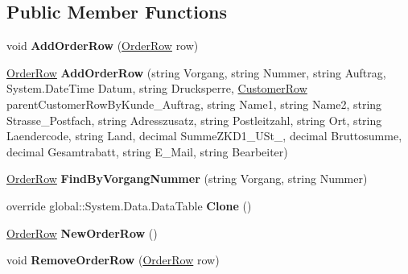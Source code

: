 \subsection*{Public Member Functions}
\begin{DoxyCompactItemize}
\item 
void {\bfseries Add\+Order\+Row} (\hyperlink{class_products_1_1_data_1_1ds_sage_1_1_order_row}{Order\+Row} row)\hypertarget{class_products_1_1_data_1_1ds_sage_1_1_order_data_table_a19b4b11e7de67d0c742c3235fbce2203}{}\label{class_products_1_1_data_1_1ds_sage_1_1_order_data_table_a19b4b11e7de67d0c742c3235fbce2203}

\item 
\hyperlink{class_products_1_1_data_1_1ds_sage_1_1_order_row}{Order\+Row} {\bfseries Add\+Order\+Row} (string Vorgang, string Nummer, string Auftrag, System.\+Date\+Time Datum, string Drucksperre, \hyperlink{class_products_1_1_data_1_1ds_sage_1_1_customer_row}{Customer\+Row} parent\+Customer\+Row\+By\+Kunde\+\_\+\+Auftrag, string Name1, string Name2, string Strasse\+\_\+\+Postfach, string Adresszusatz, string Postleitzahl, string Ort, string Laendercode, string Land, decimal Summe\+Z\+K\+D1\+\_\+\+U\+St\+\_, decimal Bruttosumme, decimal Gesamtrabatt, string E\+\_\+\+Mail, string Bearbeiter)\hypertarget{class_products_1_1_data_1_1ds_sage_1_1_order_data_table_a241a88a35aadd4bc88089666dfefdd51}{}\label{class_products_1_1_data_1_1ds_sage_1_1_order_data_table_a241a88a35aadd4bc88089666dfefdd51}

\item 
\hyperlink{class_products_1_1_data_1_1ds_sage_1_1_order_row}{Order\+Row} {\bfseries Find\+By\+Vorgang\+Nummer} (string Vorgang, string Nummer)\hypertarget{class_products_1_1_data_1_1ds_sage_1_1_order_data_table_a4be0bb55f6bb02e198df69dd40a54854}{}\label{class_products_1_1_data_1_1ds_sage_1_1_order_data_table_a4be0bb55f6bb02e198df69dd40a54854}

\item 
override global\+::\+System.\+Data.\+Data\+Table {\bfseries Clone} ()\hypertarget{class_products_1_1_data_1_1ds_sage_1_1_order_data_table_ada001c451ddc8700ef763bb0bf394cf2}{}\label{class_products_1_1_data_1_1ds_sage_1_1_order_data_table_ada001c451ddc8700ef763bb0bf394cf2}

\item 
\hyperlink{class_products_1_1_data_1_1ds_sage_1_1_order_row}{Order\+Row} {\bfseries New\+Order\+Row} ()\hypertarget{class_products_1_1_data_1_1ds_sage_1_1_order_data_table_ad6aab4e770b39c5fbe7d06e10c748cba}{}\label{class_products_1_1_data_1_1ds_sage_1_1_order_data_table_ad6aab4e770b39c5fbe7d06e10c748cba}

\item 
void {\bfseries Remove\+Order\+Row} (\hyperlink{class_products_1_1_data_1_1ds_sage_1_1_order_row}{Order\+Row} row)\hypertarget{class_products_1_1_data_1_1ds_sage_1_1_order_data_table_a51dd033b27c71138ddc3498bb7642fb8}{}\label{class_products_1_1_data_1_1ds_sage_1_1_order_data_table_a51dd033b27c71138ddc3498bb7642fb8}

\end{DoxyCompactItemize}
